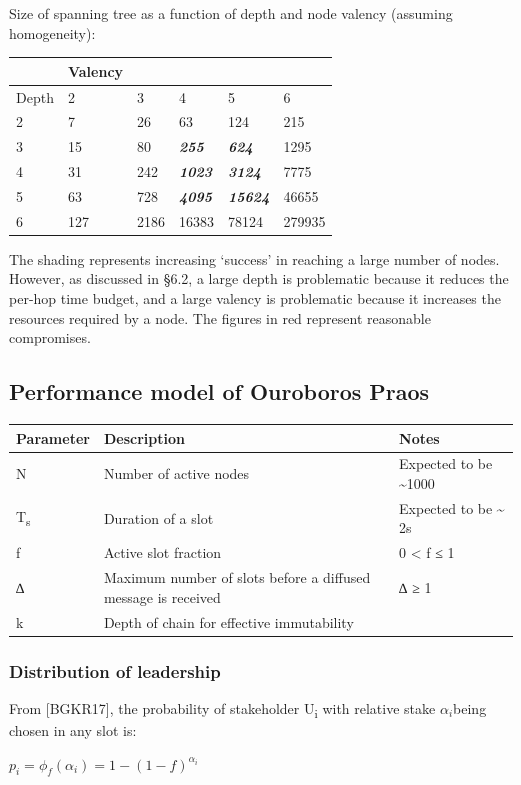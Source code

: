 \documentclass[11pt,a4paper]{article}
\begin{document}
Size of spanning tree as a function of depth and node valency (assuming
homogeneity):

\begin{longtable}[]{@{}llllll@{}}
\toprule
& Valency & & & &\tabularnewline
\midrule
\endhead
Depth & 2 & 3 & 4 & 5 & 6\tabularnewline
2 & 7 & 26 & 63 & 124 & 215\tabularnewline
3 & 15 & 80 & \emph{\textbf{255}} & \emph{\textbf{624}} &
1295\tabularnewline
4 & 31 & 242 & \emph{\textbf{1023}} & \emph{\textbf{3124}} &
7775\tabularnewline
5 & 63 & 728 & \emph{\textbf{4095}} & \emph{\textbf{15624}} &
46655\tabularnewline
6 & 127 & 2186 & 16383 & 78124 & 279935\tabularnewline
\bottomrule
\end{longtable}

The shading represents increasing `success' in reaching a large number
of nodes. However, as discussed in §6.2, a large depth is problematic
because it reduces the per-hop time budget, and a large valency is
problematic because it increases the resources required by a node. The
figures in red represent reasonable compromises.

\subsection{Performance model of Ouroboros Praos}
\label{performance-model-of-ouroboros-praos}

\begin{longtable}[]{@{}lll@{}}
\toprule
\textbf{Parameter} & \textbf{Description} &
\textbf{Notes}\tabularnewline
\midrule
\endhead
N & Number of active nodes & Expected to be
\textasciitilde{}1000\tabularnewline
T\textsubscript{s} & Duration of a slot & Expected to be
\textasciitilde{} 2s\tabularnewline
f & Active slot fraction & 0 \textless{} f ≤ 1\tabularnewline
∆ & Maximum number of slots before a diffused message is received & ∆ ≥
1\tabularnewline
k & Depth of chain for effective immutability &\tabularnewline
\bottomrule
\end{longtable}

\subsubsection{Distribution of leadership}
\label{distribution-of-leadership}

From {[}BGKR17{]}, the probability of stakeholder U\textsubscript{i}
with relative stake \(\alpha_{i}\)being chosen in any slot is:

\(p_{i} = {\phi_{f}\left( \alpha_{i} \right) = 1 - \left( 1 - f \right)^{\alpha_{i}}}_{}\)
\end{document}
